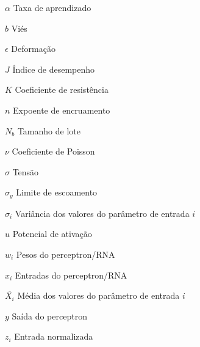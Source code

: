 \begin{simbolos}
	
	
	
	
	
	
	
	
	
	
	\item[$\alpha$] Taxa de aprendizado
	
	\item[$b$] Viés
	
	
	
	\item[$\epsilon$] Deformação
	
	
	
	
	
	\item[$J$] Índice de desempenho
	
	\item[$K$] Coeficiente de resistência
	
	
	\item[$n$] Expoente de encruamento
	\item[$N_b$] Tamanho de lote
	\item[$\nu$] Coeficiente de Poisson
	
	
	
	
	\item[$\sigma$] Tensão
	\item[$\sigma_y$] Limite de escoamento
	\item[$\sigma_i$] Variância dos valores do parâmetro de entrada $i$
	
	\item[$u$] Potencial de ativação
	
	\item[$w_i$] Pesos do perceptron/RNA
	
	
	\item[$x_i$] Entradas do perceptron/RNA
	\item[$\overline{X_i}$] Média dos valores do parâmetro de entrada $i$
	
	\item[$y$] Saída do perceptron
	
	\item[$z_i$] Entrada normalizada 	
\end{simbolos}